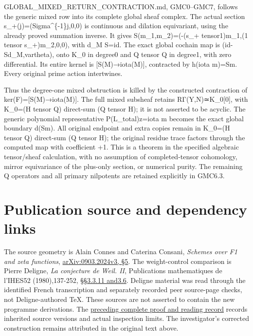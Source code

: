 GLOBAL\_MIXED\_RETURN\_CONTRACTION.md, GMC0--GMC7, follows the generic
mixed row into its complete global sheaf complex. The actual section
s\_+(j)=(Sigma\^{}\{-1\}j,0,0) is continuous and dilation equivariant,
using the already proved summation inverse. It gives
S(m\_1,m\_2)=(-(s\_+ tensor1)m\_1,(1 tensor s\_+)m\_2,0,0), with d\_M
S=id. The exact global cochain map is (id-Sd\_M,vartheta), onto K\_0 in
degree0 and Q tensor Q in degree1, with zero differential. Its entire
kernel is {[}S(M)→iota(M){]}, contracted by h(iota m)=Sm. Every original
prime action intertwines.

Thus the degree-one mixed obstruction is killed by the constructed
contraction of ker(F)={[}S(M)→iota(M){]}. The full mixed subsheaf
retains RΓ(Y,N)≃K\_0{[}0{]}, with K\_0=(H tensor Q) direct-sum (Q tensor
H); it is not asserted to be acyclic. The generic polynomial
representative P(L\_total)z=iota m becomes the exact global boundary
d(Sm). All original endpoint and extra copies remain in K\_0=(H tensor
Q) direct-sum (Q tensor H); the original residue trace factors through
the computed map with coefficient +1. This is a theorem in the specified
algebraic tensor/sheaf calculation, with no assumption of
completed-tensor cohomology, mirror equivariance of the plus-only
section, or numerical purity. The remaining Q operators and all primary
nilpotents are retained explicitly in GMC6.3.

\section{Publication source and dependency
links}\label{publication-source-and-dependency-links-4}

The source geometry is Alain Connes and Caterina Consani, \emph{Schemes
over F1 and zeta functions},
\href{https://arxiv.org/abs/0903.2024v3}{arXiv:0903.2024v3, §5}. The
weight-control comparison is Pierre Deligne, \emph{La conjecture de
Weil. II}, Publications mathematiques de l'IHES52 (1980),137-252,
\href{https://www.numdam.org/item/PMIHES_1980__52__137_0/}{§§3.3.11
and3.6}. Deligne material was read through the identified French
transcription and separately recorded peer source-page checks, not
Deligne-authored TeX. These sources are not asserted to contain the new
programme derivations. The
\href{https://github.com/KokunoYumeto/zeta-function-research-reader/blob/36a82ecca98addb8a98b48204e349737856c7223/workbenches/splitzero-tandem/continuations/20260924-cohomology-weight-and-character-lifts/BUILD_AND_REVIEW.md}{preceding
complete proof and reading record} records inherited source versions and
actual inspection limits. The investigator's corrected construction
remains attributed in the original text above.

